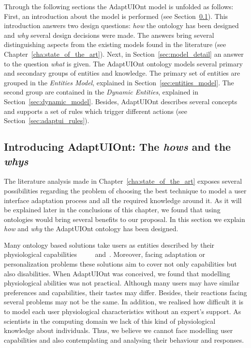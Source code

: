Through the following sections the AdaptUIOnt model is unfolded as follows: 
First, an introduction about the model is performed (see Section~\ref{sec:model_introduction}).
This introduction answers two design questions: \textit{how} the ontology has
been designed and \textit{why} several design decisions were made. The answers
bring several distinguishing aspects from the existing models found in the
literature (see Chapter~\ref{cha:state_of_the_art}). Next, in Section~\ref{sec:model_detail}
an answer to the question \textit{what} is given. The AdaptUIOnt ontology models
several primary and secondary groups of entities and knowledge. The primary
set of entities are grouped in the \textit{Entities Model}, explained in
Section~\ref{sec:entities_model}. The second group are contained in the
\textit{Dynamic Entities}, explained in Section~\ref{sec:dynamic_model}. Besides,
AdaptUIOnt describes several concepts and supports a set of rules which trigger
different actions (see Section~\ref{sec:adaptui_rules}).
% 
% 

\subsection{Introducing AdaptUIOnt: The \textit{hows} and the \textit{whys}}
\label{sec:model_introduction}

The literature analysis made in Chapter~\ref{cha:state_of_the_art} exposes
several possibilities regarding the problem of choosing the best technique
to model a user interface adaptation process and all the required knowledge
around it. As it will be explained later in the conclusions of this chapter, we
found that using ontologies would bring several benefits to our proposal. In 
this section we explain \textit{how} and \textit{why} the AdaptUIOnt ontology 
has been designed.

Many ontology based solutions take users as entities described by their physiological
capabilities~\citep{gregor_designing_2002}~\citep{razmerita_ontology_based_2003}
\citep{pereira_triple_2005}~\citep{persad_characterising_2007}~\citep{persad_cognitive_2007}
and~\citep{skillen2012ontological}. Moreover, facing adaptation or personalization
problems these solutions aim to cover not only capabilities but also disabilities.
When AdaptUIOnt was conceived, we found that modelling physiological abilities
was not practical. Although many users may have similar preferences and capabilities,
their tastes may differ. Besides, their reactions facing several problems may not
be the same. In addition, we realised how difficult it is to model each user
physiological characteristics without an expert's support. As scientists in the
computing domain we lack of this kind of physiological knowledge about individuals.
Thus, we believe we cannot face modelling user capabilities and also contemplating
and analysing their behaviour and responses.

